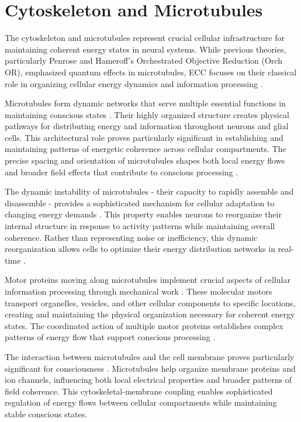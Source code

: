 \section{Cytoskeleton and Microtubules}

The cytoskeleton and microtubules represent crucial cellular infrastructure for maintaining coherent energy states in neural systems. While previous theories, particularly Penrose and Hameroff's Orchestrated Objective Reduction (Orch OR), emphasized quantum effects in microtubules, ECC focuses on their classical role in organizing cellular energy dynamics and information processing \cite{Fletcher2010}.

Microtubules form dynamic networks that serve multiple essential functions in maintaining conscious states \cite{Baas2011}. Their highly organized structure creates physical pathways for distributing energy and information throughout neurons and glial cells. This architectural role proves particularly significant in establishing and maintaining patterns of energetic coherence across cellular compartments. The precise spacing and orientation of microtubules shapes both local energy flows and broader field effects that contribute to conscious processing \cite{Conde2009}.

The dynamic instability of microtubules - their capacity to rapidly assemble and disassemble - provides a sophisticated mechanism for cellular adaptation to changing energy demands \cite{Howard2003}. This property enables neurons to reorganize their internal structure in response to activity patterns while maintaining overall coherence. Rather than representing noise or inefficiency, this dynamic reorganization allows cells to optimize their energy distribution networks in real-time \cite{Kapitein2015}.

Motor proteins moving along microtubules implement crucial aspects of cellular information processing through mechanical work \cite{Kueh2009}. These molecular motors transport organelles, vesicles, and other cellular components to specific locations, creating and maintaining the physical organization necessary for coherent energy states. The coordinated action of multiple motor proteins establishes complex patterns of energy flow that support conscious processing \cite{Kirschner1986}.

The interaction between microtubules and the cell membrane proves particularly significant for consciousness \cite{Wittmann2001}. Microtubules help organize membrane proteins and ion channels, influencing both local electrical properties and broader patterns of field coherence. This cytoskeletal-membrane coupling enables sophisticated regulation of energy flows between cellular compartments while maintaining stable conscious states.

